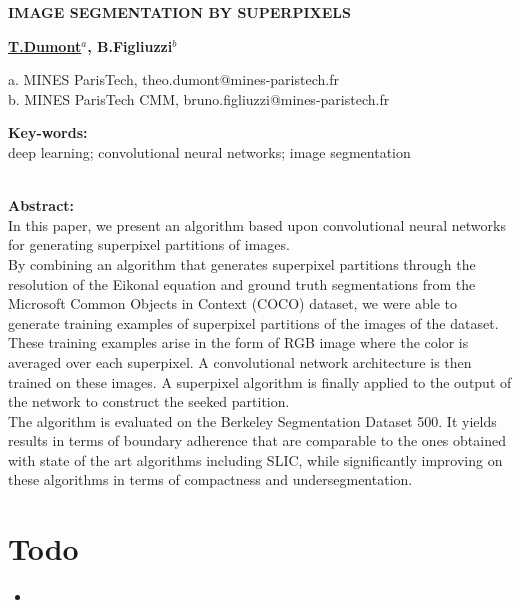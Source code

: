 \documentclass{article}
\begin{document}
\newcommand{\spp}{superpixel}

\begin{center}
    \begin{Large}\textbf{IMAGE SEGMENTATION BY SUPERPIXELS}\end{Large}

    \vspace{1cm}
    \begin{large}\textbf{\underline{T.Dumont$^a$}, B.Figliuzzi$^b$}\end{large}

    \vspace{0.5cm}
    a. MINES ParisTech, theo.dumont@mines-paristech.fr\\
    b. MINES ParisTech CMM, bruno.figliuzzi@mines-paristech.fr
    \vspace{1cm}
\end{center}

\begin{center}
\noindent\textbf{Key-words: }\\
deep learning; convolutional neural networks; image segmentation\\
\ \\
\end{center}
\textbf{Abstract: }\\
In this paper, we present an algorithm based upon convolutional neural networks for generating superpixel partitions of images.\\
By combining an algorithm that generates superpixel partitions through the resolution of the Eikonal equation and ground truth segmentations from the Microsoft Common Objects in Context (COCO) dataset, we were able to generate training examples of superpixel partitions of the images of the dataset. These training examples arise in the form of RGB image where the color is averaged over each superpixel. A convolutional network architecture is then trained on these images. A superpixel algorithm is finally applied to the output of the network to construct the seeked partition.\\
The algorithm is evaluated on the Berkeley Segmentation Dataset 500. It yields results in terms of boundary adherence that are comparable to the ones obtained with state of the art algorithms including SLIC, while significantly improving on these algorithms in terms of compactness and undersegmentation.

\tableofcontents

\section*{Todo}
\begin{itemize}
    \item
\end{itemize}
\end{document}
